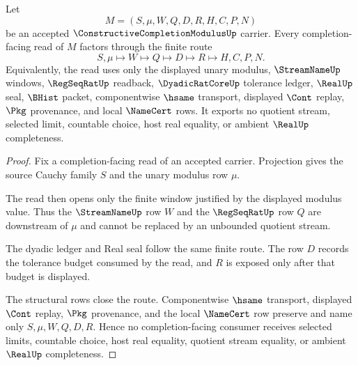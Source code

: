 \begin{theorem}
\label{thm:constructive-completion-modulus-finite-route}
Let
$$
M=(S,\mu,W,Q,D,R,H,C,P,N)
$$
be an accepted $\ConstructiveCompletionModulusUp$ carrier. Every completion-facing read of $M$ factors through the finite route
$$
S,\mu\longmapsto W\longmapsto Q\longmapsto D\longmapsto R\longmapsto H,C,P,N .
$$
Equivalently, the read uses only the displayed unary modulus, $\StreamNameUp$ windows, $\RegSeqRatUp$ readback, $\DyadicRatCoreUp$ tolerance ledger, $\RealUp$ seal, $\BHist$ packet, componentwise $\hsame$ transport, displayed $\Cont$ replay, $\Pkg$ provenance, and local $\NameCert$ rows. It exports no quotient stream, selected limit, countable choice, host real equality, or ambient $\RealUp$ completeness.
\end{theorem}
\begin{proof}
Fix a completion-facing read of an accepted carrier. Projection gives the source Cauchy family $S$ and the unary modulus row $\mu$.

The read then opens only the finite window justified by the displayed modulus value. Thus the $\StreamNameUp$ row $W$ and the $\RegSeqRatUp$ row $Q$ are downstream of $\mu$ and cannot be replaced by an unbounded quotient stream.

The dyadic ledger and Real seal follow the same finite route. The row $D$ records the tolerance budget consumed by the read, and $R$ is exposed only after that budget is displayed.

The structural rows close the route. Componentwise $\hsame$ transport, displayed $\Cont$ replay, $\Pkg$ provenance, and the local $\NameCert$ row preserve and name only $S,\mu,W,Q,D,R$. Hence no completion-facing consumer receives selected limits, countable choice, host real equality, quotient stream equality, or ambient $\RealUp$ completeness.
\end{proof}


